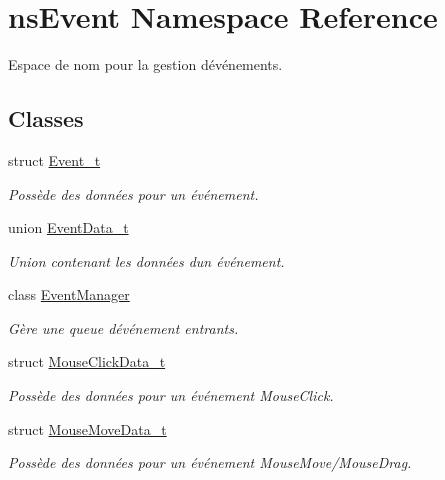 \hypertarget{namespacens_event}{}\section{ns\+Event Namespace Reference}
\label{namespacens_event}


Espace de nom pour la gestion d\textquotesingle{}événements.  


\subsection*{Classes}
\begin{DoxyCompactItemize}
\item 
struct \hyperlink{structns_event_1_1_event__t}{Event\+\_\+t}
\begin{DoxyCompactList}\small\item\em Possède des données pour un événement. \end{DoxyCompactList}\item 
union \hyperlink{unionns_event_1_1_event_data__t}{Event\+Data\+\_\+t}
\begin{DoxyCompactList}\small\item\em Union contenant les données d\textquotesingle{}un événement. \end{DoxyCompactList}\item 
class \hyperlink{classns_event_1_1_event_manager}{Event\+Manager}
\begin{DoxyCompactList}\small\item\em Gère une queue d\textquotesingle{}événement entrants. \end{DoxyCompactList}\item 
struct \hyperlink{structns_event_1_1_mouse_click_data__t}{Mouse\+Click\+Data\+\_\+t}
\begin{DoxyCompactList}\small\item\em Possède des données pour un événement Mouse\+Click. \end{DoxyCompactList}\item 
struct \hyperlink{structns_event_1_1_mouse_move_data__t}{Mouse\+Move\+Data\+\_\+t}
\begin{DoxyCompactList}\small\item\em Possède des données pour un événement Mouse\+Move/\+Mouse\+Drag. \end{DoxyCompactList}\end{DoxyCompactItemize}
